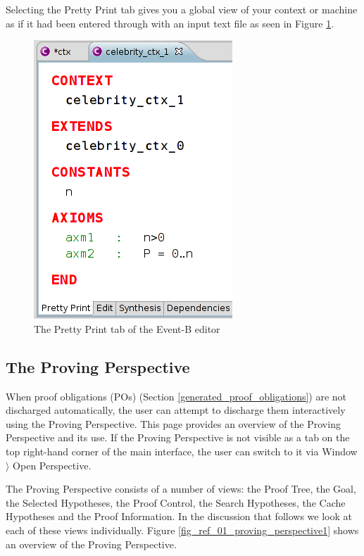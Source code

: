 Selecting the \textsf{Pretty Print} tab gives you a global view of your context or machine as if it had been entered through with an input text file as seen in Figure \ref{fig_ref_01_eventb_editor10}.

\begin{figure}[!ht]
\begin{center}
	\includegraphics{img/reference/ref_01_eventb_editor10.png}
	\caption{The Pretty Print tab of the Event-B editor}
	\label{fig_ref_01_eventb_editor10}
\end{center}
\end{figure}

\subsection{The Proving Perspective}
\label{proving_perspective}

When proof obligations (POs) (Section \ref{generated_proof_obligations}) are not discharged automatically, the user can attempt to discharge them interactively using the Proving Perspective. This page provides an overview of the Proving Perspective and its use. If the Proving Perspective is not visible as a tab on the top right-hand corner of the main interface, the user can switch to it via \textsf{Window $\rangle$ Open Perspective}.

The Proving Perspective consists of a number of views: the \textsf{Proof Tree}, the \textsf{Goal}, the \textsf{Selected Hypotheses}, the \textsf{Proof Control}, the \textsf{Search Hypotheses}, the \textsf{Cache Hypotheses} and the \textsf{Proof Information}. In the discussion that follows we look at each of these views individually. Figure \ref{fig_ref_01_proving_perspective1} shows an overview of the Proving Perspective.

